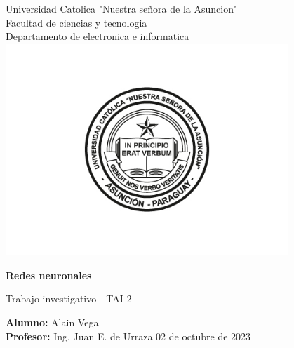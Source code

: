 \documentclass[12pt, letterpaper, spanish]{article}
\begin{document}
\begin{titlepage}
\begin{center}
    \Large{Universidad Catolica "Nuestra señora de la Asuncion" \\
    Facultad de ciencias y tecnologia \\
    Departamento de electronica e informatica}
    \includegraphics[width=0.8\textwidth]{UcaLogo.jpg}
    \begin{center}
        \LARGE{\textbf{Redes neuronales}}
    \end{center} 
    \Large{Trabajo investigativo - TAI 2}
    \vspace{1cm}
\end{center}
    \large
    \textbf{Alumno: }Alain Vega \\
    \textbf{Profesor: }Ing. Juan E. de Urraza
    \vfill
    \hfill{02 de octubre de 2023}
\end{titlepage}

\newpage
\end{document}
